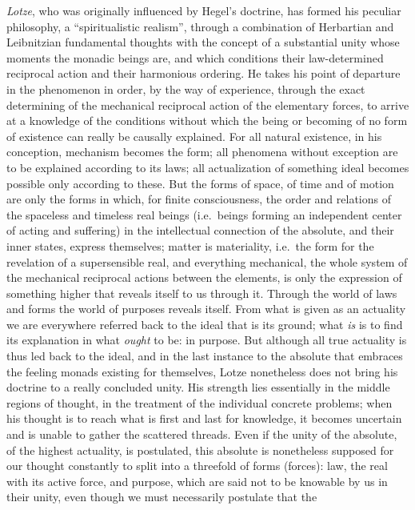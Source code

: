 \emph{Lotze}, who was originally influenced by Hegel's doctrine, has
formed his peculiar philosophy, a ``spiritualistic realism'', through a
combination of Herbartian and Leibnitzian fundamental thoughts with the
concept of a substantial unity whose moments the monadic beings are,
and which conditions their law-determined reciprocal action and their
harmonious ordering. He takes his point of departure in the phenomenon
in order, by the way of experience, through the exact determining of
the mechanical reciprocal action of the elementary forces, to arrive at
a knowledge of the conditions without which the being or becoming of no
form of existence can really be causally explained. For all natural
existence, in his conception, mechanism becomes the form; all phenomena
without exception are to be explained according to its laws; all
actualization of something ideal becomes possible only according to
these. But the forms of space, of time and of motion are only the forms
in which, for finite consciousness, the order and relations of the
spaceless and timeless real beings (i.e.\ beings forming an independent
center of acting and suffering) in the intellectual connection of the
absolute, and their inner states, express themselves; matter is
materiality, i.e.\ the form for the revelation of a supersensible real,
and everything mechanical, the whole system of the mechanical
reciprocal actions between the elements, is only the expression of
something higher that reveals itself to us through it. Through the
world of laws and forms the world of purposes reveals itself. From what
is given as an actuality we are everywhere referred back to the ideal
that is its ground; what \emph{is} is to find its explanation in what
\emph{ought} to be: in purpose. But although all true actuality is thus
led back to the ideal, and in the last instance to the absolute that
embraces the feeling monads existing for themselves, Lotze nonetheless
does not bring his doctrine to a really concluded unity. His strength
lies  \setcounter{footnote}{0}essentially in the middle
regions of thought, in the treatment of the individual concrete
problems; when his thought is to reach what is first and last for
knowledge, it becomes uncertain and is unable to gather the scattered
threads. Even if the unity of the absolute, of the highest actuality,
is postulated, this absolute is nonetheless supposed for our thought
constantly to split into a threefold of forms (forces): law, the real
with its active force, and purpose, which are said not to be knowable by
us in their unity, even though we must necessarily postulate that the
